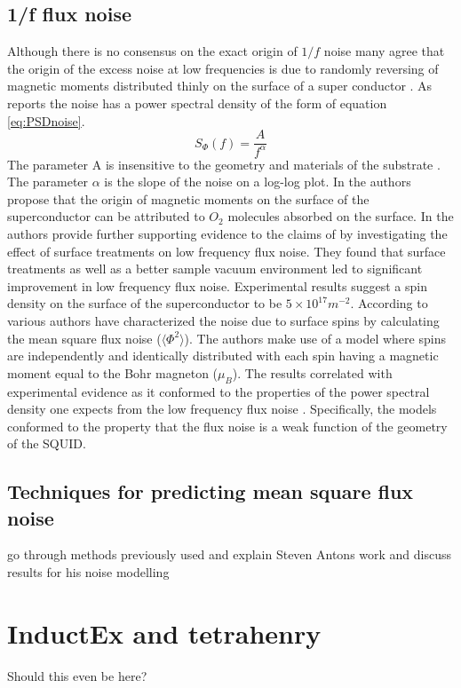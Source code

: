 \subsection{1/f flux noise}
Although there is no consensus on the exact origin of $1/f$ noise many agree that the origin of the excess noise at low frequencies is due to randomly reversing of magnetic moments distributed thinly on the surface of a super conductor \cite{FluxNoiseCol}. As \cite{FluxNoiseCol} reports the noise has a power spectral density of the form of equation \ref{eq:PSDnoise}.
\begin{equation}
    S_\Phi(f) = \frac{A}{f^\alpha}
    \label{eq:PSDnoise}
\end{equation}
The parameter A is insensitive to the geometry and materials of the substrate \cite{fluxNoiseSquidsStevenAnton}. The parameter $\alpha$ is the slope of the noise on a log-log plot. In \cite{SurfaceSpinOrig} the authors propose that the origin of magnetic moments on the surface of the superconductor can be attributed to $O_2$ molecules absorbed on the surface. In \cite{OriginAndReductionOf1/fNoise} the authors provide further supporting evidence to the claims of \cite{SurfaceSpinOrig} by investigating the effect of surface treatments on low frequency flux noise. They found that surface treatments as well as a better sample vacuum environment led to significant improvement in low frequency flux noise. Experimental results suggest a spin density on the surface of the superconductor to be $5\times10^{17}m^{-2}$. According to \cite{fluxNoiseSquidsStevenAnton} various authors have characterized the noise due to surface spins by calculating the mean square flux noise ($\langle \Phi^2\rangle $). The authors make use of a model where spins are independently and identically distributed with each spin having a magnetic moment equal to the Bohr magneton ($\mu_B$). The results correlated with experimental evidence as it conformed to the properties of the power spectral density one expects from the low frequency flux noise \cite{fluxNoiseSquidsStevenAnton}. Specifically, the models conformed to the property that the flux noise is a weak function of the geometry of the SQUID.

\subsection{Techniques for predicting mean square flux noise}
go through methods previously used and explain Steven Antons work and discuss results for his noise modelling

\section{InductEx and tetrahenry}
Should this even be here?
